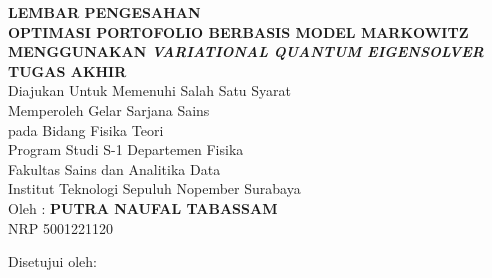 \begin{center}
\large{\textbf{LEMBAR PENGESAHAN}} \\
\vspace{4mm}
\textbf{OPTIMASI PORTOFOLIO BERBASIS MODEL MARKOWITZ MENGGUNAKAN \textit{VARIATIONAL QUANTUM EIGENSOLVER}} \\
\vspace{4mm}
\textbf{TUGAS AKHIR} \\
\vspace{4mm}
Diajukan Untuk Memenuhi Salah Satu Syarat \\
Memperoleh Gelar Sarjana Sains \\
pada Bidang Fisika Teori \\
Program Studi S-1 Departemen Fisika \\
Fakultas Sains dan Analitika Data\\
Institut Teknologi Sepuluh Nopember Surabaya \\
\vspace{4mm}
Oleh : \textbf{PUTRA NAUFAL TABASSAM} \\
\vspace{1mm}
NRP 5001221120 \\
\vspace{4mm}
\begin{center}
	Disetujui oleh:
\end{center}

\vspace{4ex}

\begingroup
\setlength{\tabcolsep}{0pt}


\end{center}

